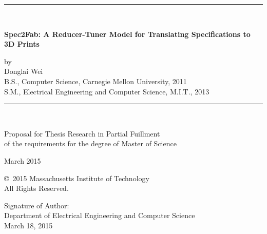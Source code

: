 

\thispagestyle{empty}

\begin{centering}
\rule{\textwidth}{.05in}\\ \vspace{.10in}

\Large \textbf{\textsf{ Spec2Fab: A Reducer-Tuner Model for Translating Specifications to 3D Prints
}} \\
\normalsize

\vspace{.1in}
by \\

\vspace{.1in}
Donglai Wei \\

\vspace{.1in} B.S., Computer Science,
Carnegie Mellon University, 2011 \\

\vspace{.0in} S.M., Electrical Engineering and Computer Science,
M.I.T., 2013 \\

\vspace{.1in}
\rule{\textwidth}{.05in}\\

\vspace{.2in}

Proposal for Thesis Research in Partial Fuillment\\
of the requirements for the degree of Master of Science\\

\vspace{.15in}

\vspace{.1in} March 2015

\vspace{.15in} \copyright\ 2015
Massachusetts Institute of Technology \\
All Rights Reserved. \\

\end{centering}

\vspace{.3in}

\noindent
Signature of Author: \underline{\mbox{\hspace{4.28in}}} \\
\vspace{-.25in}
{\flushright Department of Electrical Engineering and Computer Science \\
March 18, 2015\\
}

